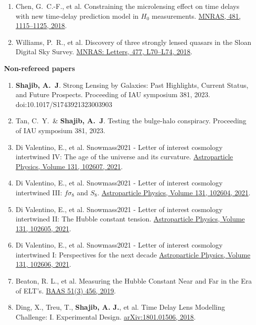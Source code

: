 \documentclass[margin, line]{res}
\begin{document}
\begin{resume}
\begin{enumerate}
	\item Chen, G.~C.-F., et al. Constraining the microlensing effect on time delays with new time-delay prediction model in $H_0$ measurements. \href{https://doi.org/10.1093/mnras/sty2350}{MNRAS, 481, 1115--1125, 2018}.
 	\item Williams, P.~R., et al. Discovery of three strongly lensed quasars in the Sloan Digital Sky Survey. \href{https://doi.org/10.1093/mnrasl/sly043}{MNRAS: Letters, 477, L70--L74, 2018}.
\end{enumerate}

\textbf{Non-refereed papers}
\begin{enumerate}
	\item \textbf{Shajib, A.~J}. Strong Lensing by Galaxies: Past Highlights, Current Status, and Future Prospects. Proceeding of IAU symposium 381, 2023. doi:10.1017/S1743921323003903
	\item Tan, C.~Y.\mentee~\& \textbf{Shajib, A.~J}. Testing the bulge-halo conspiracy. Proceeding of IAU symposium 381, 2023.
	\item Di Valentino, E., et al. Snowmass2021 - Letter of interest cosmology intertwined IV: The age of the universe and its curvature. \href{https://www.sciencedirect.com/science/article/abs/pii/S0927650521000517}{Astroparticle Physics, Volume 131, 102607, 2021}.
	\item Di Valentino, E., et al. Snowmass2021 - Letter of interest cosmology intertwined III: $f\sigma_8$ and $S_8$. \href{https://www.sciencedirect.com/science/article/abs/pii/S0927650521000487}{Astroparticle Physics, Volume 131, 102604, 2021}.
	\item Di Valentino, E., et al. Snowmass2021 - Letter of interest cosmology intertwined II: The Hubble constant tension. \href{https://www.sciencedirect.com/science/article/abs/pii/S0927650521000499}{Astroparticle Physics, Volume 131, 102605, 2021}.
	\item Di Valentino, E., et al. Snowmass2021 - Letter of interest cosmology intertwined I: Perspectives for the next decade \href{https://www.sciencedirect.com/science/article/abs/pii/S0927650521000505}{Astroparticle Physics, Volume 131, 102606, 2021}.
	\item Beaton, R. L., et al. Measuring the Hubble Constant Near and Far in the Era of ELT's. \href{https://ui.adsabs.harvard.edu/abs/2019BAAS...51c.456B/abstract}{BAAS 51(3) 456, 	2019}.
	\item Ding, X., Treu, T., {\bf Shajib, A. J.}, et al. Time Delay Lens Modelling Challenge: I. Experimental Design. \href{https://arxiv.org/abs/1801.01506}{arXiv:1801.01506, 2018}.


\end{enumerate}
\end{resume}
\end{document}
